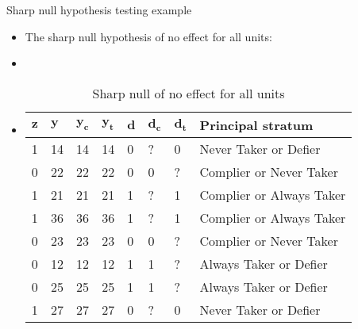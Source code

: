 \documentclass[table, xcolor={dvipsnames}, 9pt]{beamer}
\theoremstyle{newstyle}
\begin{document}
\begin{frame}{Sharp null hypothesis testing example}
\begin{itemize}
\item The sharp null hypothesis of no effect for all units:
\item[]
\item[]
\begin{table}[H]
\centering
    \begin{tabular}{l|l|l|l|l|l|l|l}
    $\mathbf{z}$ & $\mathbf{y}$ & $\mathbf{y_c}$ & $\mathbf{y_t}$ & $\mathbf{d}$ & $\mathbf{d_c}$ & $\mathbf{d_t}$ & Principal stratum\\ \hline
    1 & 14 & 14 & 14 & 0 & ? & 0 & Never Taker or Defier\\
    0 & 22 & 22 & 22 & 0 & 0 & ? & Complier or Never Taker\\
    1 & 21 & 21 & 21 & 1 & ? & 1 & Complier or Always Taker \\
    1 & 36 & 36 & 36 & 1 & ? & 1 & Complier or Always Taker \\
    0 & 23 & 23 & 23 & 0 & 0 & ? & Complier or Never Taker \\
    0 & 12 & 12 & 12 & 1 & 1 & ? & Always Taker or Defier \\
    0 & 25 & 25 & 25 & 1 & 1 & ? & Always Taker or Defier\\
    1 & 27 & 27  & 27 & 0 & ? & 0 & Never Taker or Defier \\
    \end{tabular}
    \caption{Sharp null of no effect for all units}
\end{table}  
\end{itemize}
\end{frame}
\end{document}
